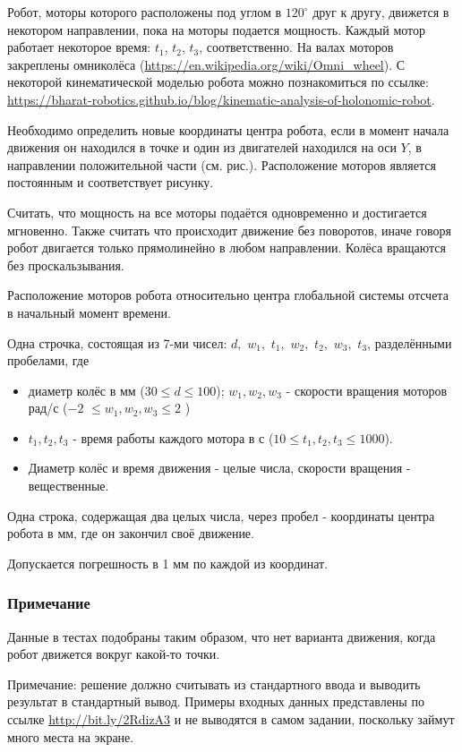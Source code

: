 
Робот, моторы которого расположены под углом в $120^{\circ}$ друг к другу, 
движется в некотором направлении, пока на моторы подается мощность. Каждый мотор работает некоторое время: 
$t_1$, $t_2$, $t_3$, соответственно. На валах моторов закреплены омниколёса 
(\url{https://en.wikipedia.org/wiki/Omni_wheel}). С некоторой кинематической моделью робота можно 
познакомиться по ссылке: 
\url{https://bharat-robotics.github.io/blog/kinematic-analysis-of-holonomic-robot}.

Необходимо определить новые координаты центра робота, если в момент начала движения он находился в точке 
и один из двигателей находился на оси $Y$, в направлении положительной части (см. рис.). 
Расположение моторов является постоянным и соответствует рисунку.

Считать, что мощность на все моторы подаётся одновременно и достигается мгновенно. Также считать что 
происходит движение без поворотов, иначе говоря робот двигается только прямолинейно в любом направлении. 
Колёса вращаются без проскальзывания.


Расположение моторов робота относительно центра глобальной системы отсчета в начальный момент времени.


Одна строчка, состоящая из 7-ми чисел: $d,$ $w_1,$ $t_1,$ $w_2,$ $t_2,$ $w_3,$ $t_3$, разделёнными пробелами, где

\begin{itemize}
    \item диаметр колёс в мм ($30 \leq d \leq 100$); $w_1, w_2, w_3$ -  скорости вращения моторов рад/с ($-2$ $\leq w_1, w_2, w_3 \leq 2$ )
    \item $t_1, t_2, t_3$ - время работы каждого мотора в с ($10 \leq t_1, t_2, t_3 \leq 1000$).
    \item Диаметр колёс и время движения - целые числа, скорости вращения - вещественные.
\end{itemize}

\outputfmtSection

Одна строка, содержащая два целых числа, через пробел - координаты центра робота в мм, где он закончил своё движение.

Допускается погрешность в 1 мм по каждой из координат.

\subsubsection*{Примечание}

Данные в тестах подобраны таким образом, что нет варианта движения, когда робот движется вокруг какой-то точки.

Примечание: решение должно считывать из стандартного ввода и выводить результат в стандартный вывод. Примеры входных данных представлены по 
ссылке \url{http://bit.ly/2RdizA3} и не выводятся в самом задании, поскольку займут много места на экране.

